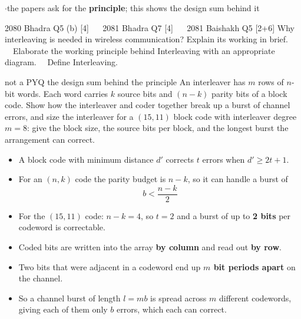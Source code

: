 \hr

{\color{sub}\footnotesize {}  \gap$\cdot$\gap the papers ask for the \textbf{principle}; this shows the
design sum behind it}

\begin{asked}{2080 Bhadra \textperiodcentered{} Q5 (b) \textperiodcentered{} [4]
\ \textperiodcentered{} \ 2081 Bhadra \textperiodcentered{} Q7 \textperiodcentered{} [4]
\ \textperiodcentered{} \ 2081 Baishakh \textperiodcentered{} Q5 \textperiodcentered{} [2+6]}
Why interleaving is needed in wireless communication? Explain its working in brief.
\ \textperiodcentered{}\ Elaborate the working principle behind Interleaving with an appropriate
diagram. \ \textperiodcentered{}\ Define Interleaving.
\end{asked}
\begin{asked}[PROBLEM]{not a PYQ \textperiodcentered{} the design sum behind the principle \added}
An interleaver has $m$ rows of $n$-bit words. Each word carries $k$ source bits and $(n-k)$
parity bits of a block code. Show how the interleaver and coder together break up a burst of
channel errors, and size the interleaver for a $(15,11)$ block code with interleaver degree
$m = 8$: give the block size, the source bits per block, and the longest burst the arrangement
can correct.
\end{asked}

\begin{itemize}
  \item A block code with minimum distance $d'$ corrects $t$ errors when $d' \ge 2t+1$.
  \item For an $(n,k)$ code the parity budget is $n-k$, so it can handle a burst of
        \[ b < \frac{n-k}{2} \]
  \item For the $(15,11)$ code: \; $n-k = 4$, so $t = 2$ and a burst of up to
        \textbf{2 bits} per codeword is correctable.
\end{itemize}

\begin{itemize}
  \item Coded bits are written into the array \textbf{by column} and read out \textbf{by row}.
  \item Two bits that were adjacent in a codeword end up \textbf{$m$ bit periods apart} on the
        channel.
  \item So a channel burst of length $l = mb$ is spread across $m$ different codewords, giving
        each of them only $b$ errors, which each can correct.
\end{itemize}

